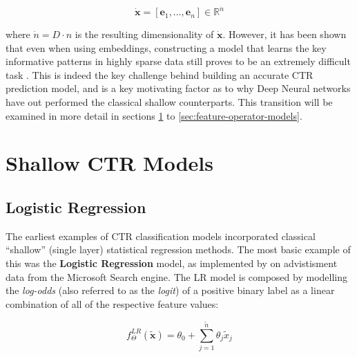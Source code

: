 \documentclass{mldsmsc}
\begin{document}
\begin{equation}
    \dot{\mathbf{x}} = \left[ \mathbf{e}_1, \dots , \mathbf{e}_n\right]
    \in \mathbb{R}^{\dot{n}}
\end{equation}

where $\dot{n} = D\cdot n$
is the resulting dimensionality of $\dot{\mathbf{x}}$. However, it has been shown that
even when using embeddings, constructing a model that learns the key informative patterns
in highly sparse data still proves to be an extremely difficult task \citep{RefWorks:gu2021ad,RefWorks:zhang2021deep}.
This is indeed the key challenge behind building an
accurate CTR prediction model, and is a key motivating factor as to why Deep Neural
networks have out performed the classical shallow counterparts. This transition will be examined
in more detail in sections \ref{sec:shallow-models} to \ref{sec:feature-operator-models}.

\section{Shallow CTR Models}
\label{sec:shallow-models}

\subsection{Logistic Regression}

The earliest examples of CTR classification models incorporated classical ``shallow'' 
(single layer) statistical regression methods. The most basic example of this was 
the \textbf{Logistic Regression} model, as implemented by \cite{RefWorks:richardson2007predicting} on
advistisment data from the Microsoft Search engine. The LR model
is composed by modelling the \emph{log-odds} (also referred to as the \emph{logit}) 
of a positive binary label as a linear combination
of all of the respective feature values:

\begin{equation}
\label{eqn:lr-model}
f_{\Theta}^{LR}(\tilde{\mathbf{x}}) = \theta_0 + \sum_{j=1}^{\tilde{n}}\theta_j \tilde{x}_j
\end{equation}
\end{document}
